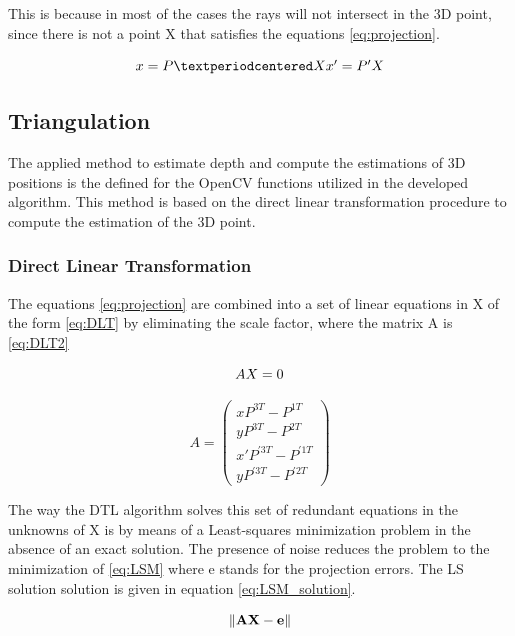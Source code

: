 This is because in most of the cases the rays will not intersect in the 3D point, since there is not a point X that satisfies the equations \ref{eq:projection}. 

\begin{equation}
	\centering
	x  = P·X  $$\\
	x' = P'X $$
	\label{eq:projection}
\end{equation} 

\subsection{Triangulation}
The applied method to estimate depth and compute the estimations of 3D positions is the defined for the OpenCV functions utilized in the developed algorithm. 
This method is based on the direct linear transformation procedure to compute the estimation of the 3D point.

\subsubsection{Direct Linear Transformation}
The equations \ref{eq:projection} are combined into a set of linear equations in X of the form \ref{eq:DLT} by eliminating the scale factor, where the matrix A is \ref{eq:DLT2}

\begin{equation}
	\centering
	AX = 0 
	\label{eq:DLT}
\end{equation}

\begin{equation}
A =
 \begin{pmatrix}
  xP^{3T} - P^{1T} \\
  yP^{3T} - P^{2T} \\
  x'P^{'3T} - P^{'1T} \\
  yP^{'3T} - P^{'2T}
 \end{pmatrix}
 \label{eq:DLT2}
\end{equation}

The way the DTL algorithm solves this set of redundant equations in the unknowns of X is by means of a Least-squares minimization problem in the absence of an exact solution. 
The presence of noise reduces the problem to the minimization of \ref{eq:LSM} where e stands for the projection errors.
The LS solution solution is given in equation \ref{eq:LSM_solution}.

\begin{equation}
	\centering
	\lVert \mathbf{AX-e} \rVert 
	\label{eq:LSM}
\end{equation}


